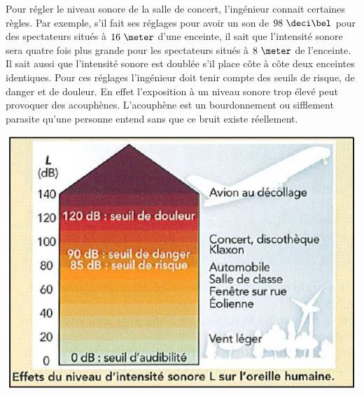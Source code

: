 \begin{enumerate}
\vspace{0.3cm}

\begin{minipage}[c]{.46\linewidth}
Pour régler le niveau sonore de la salle de
concert, l'ingénieur connait certaines règles.
Par exemple, s'il fait ses réglages pour avoir
un son de $98\text{ }\deci\bel$ pour des spectateurs situés à $16\text{ }\meter$ d'une enceinte, il sait que l'intensité sonore sera quatre fois plus grande pour les spectateurs situés à $8\text{ }\meter$ de l'enceinte. Il sait aussi que l'intensité sonore est doublée s'il place côte à côte deux enceintes identiques. Pour ces réglages l'ingénieur doit tenir compte des seuils de risque, de danger et de douleur. En effet l'exposition à un niveau sonore trop élevé peut provoquer des acouphènes. L'acouphène est un bourdonnement ou sifflement parasite qu'une personne entend
sans que ce bruit existe réellement.
\end{minipage}
\begin{minipage}[c]{.46\linewidth}
\begin{center}
\includegraphics[width=\columnwidth]{images/Exo3_Ondes_Intensite_Sonore_Oreille_Humaine}
\end{center}
\end{minipage}

\vspace{0.3cm}


\end{enumerate}
